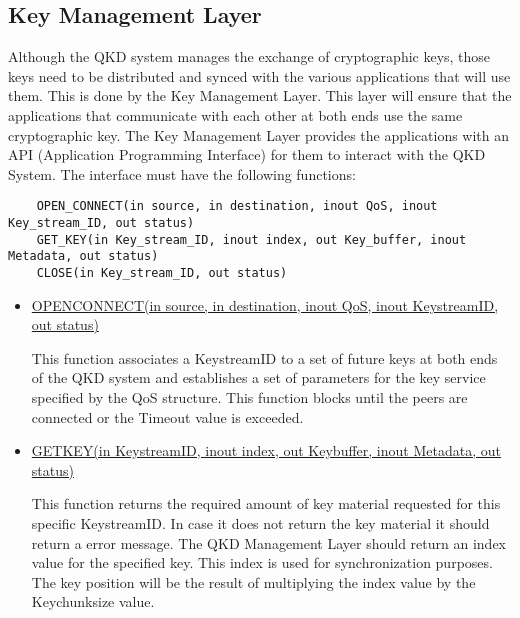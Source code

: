 \begin{refsection}
\subsection{Key Management Layer}

Although the QKD system manages the exchange of cryptographic keys, those keys need to be distributed and synced with the various applications that will use them. This is done by the Key Management Layer. This layer will ensure that the applications that communicate with each other at both ends use the same cryptographic key. The Key Management Layer provides the applications with an API (Application Programming Interface) for them to interact with the QKD System. The interface must have the following functions: 

\begin{lstlisting}
	OPEN_CONNECT(in source, in destination, inout QoS, inout Key_stream_ID, out status)
	GET_KEY(in Key_stream_ID, inout index, out Key_buffer, inout Metadata, out status)
	CLOSE(in Key_stream_ID, out status)
\end{lstlisting}

\pagebreak

\begin{itemize}
	
	\item\underline{OPEN\textunderscore CONNECT(in source, in destination, inout QoS, inout Key\textunderscore stream\textunderscore ID, out status)}
	
		This function associates a Key\textunderscore stream\textunderscore ID to a set of future keys at both ends of the QKD system and establishes a set of parameters for the key service specified by the QoS structure. This function blocks until the peers are connected or the Timeout value is exceeded.
	
	\item\underline{GET\textunderscore KEY(in Key\textunderscore stream\textunderscore ID, inout index, out Key\textunderscore buffer, inout Metadata, out status)}
	
		This function returns the required amount of key material requested for this specific Key\textunderscore stream\textunderscore ID. In case it does not return the key material it should return a error message. The QKD Management Layer should return an index value for the specified key. This index is used for synchronization purposes. The key position will be the result of multiplying the index value by the Key\textunderscore chunk\textunderscore size value. 
		

\end{itemize}
\end{refsection}
